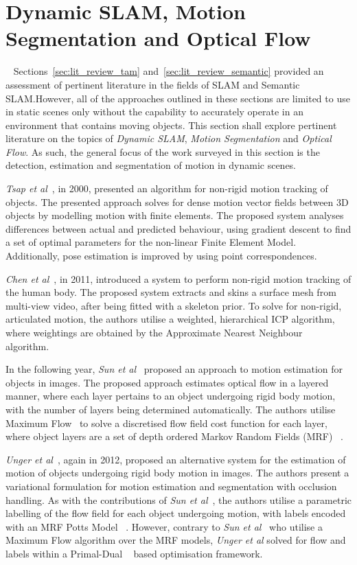 \section{Dynamic SLAM, Motion Segmentation and Optical Flow}
~\label{sec:lit_review_dynamic}
Sections~\ref{sec:lit_review_tam} and~\ref{sec:lit_review_semantic} provided an assessment 
of pertinent literature in the fields of SLAM and Semantic SLAM.\@ However, all of the 
approaches outlined in these sections are limited to use in static scenes only without 
the capability to accurately operate in an environment that contains moving objects. This 
section shall explore pertinent literature on the topics of \textit{Dynamic SLAM}, 
\textit{Motion Segmentation} and \textit{Optical Flow}. As such, the general focus of the 
work surveyed in this section is the detection, estimation and segmentation of motion in 
dynamic scenes.

\textit{Tsap et al}~\cite{Tsap2000}, in 2000, presented an algorithm for non-rigid motion 
tracking of objects. The presented approach solves for dense motion vector fields between 
3D objects by modelling motion with finite elements. The proposed system analyses differences 
between actual and predicted behaviour, using gradient descent to find a set of optimal parameters 
for the non-linear Finite Element Model. Additionally, pose estimation is improved by using point 
correspondences.

\textit{Chen et al}~\cite{Chen2011}, in 2011, introduced a system to perform non-rigid motion 
tracking of the human body. The proposed system extracts and skins a surface mesh from 
multi-view video, after being fitted with a skeleton prior. To solve for non-rigid, articulated 
motion, the authors utilise a weighted, hierarchical ICP algorithm, where weightings are obtained 
by the Approximate Nearest Neighbour~\cite{Indyk2000} algorithm.

In the following year, \textit{Sun et al}~\cite{Sun2012} proposed an approach to motion estimation 
for objects in images. The proposed approach estimates optical flow in a layered manner, where each 
layer pertains to an object undergoing rigid body motion, with the number of layers being determined 
automatically. The authors utilise Maximum Flow~\cite{Lamich2017} to solve a discretised flow field cost 
function for each layer, where object layers are a set of depth ordered Markov Random Fields (MRF) 
~\cite{BishopPRML, Murphy2012ML}.

\textit{Unger et al}~\cite{Unger2012}, again in 2012, proposed an alternative system for the 
estimation of motion of objects undergoing rigid body motion in images. The authors present a 
variational formulation for motion estimation and segmentation with occlusion handling. As with 
the contributions of \textit{Sun et al}~\cite{Sun2012}, the authors utilise a parametric labelling 
of the flow field for each object undergoing motion, with labels encoded with an MRF Potts Model
~\cite{Levada2008}. However, contrary to \textit{Sun et al}~\cite{Sun2012} who utilise a Maximum Flow 
algorithm over the MRF models, \textit{Unger et al} solved for flow and labels within a Primal-Dual
~\cite{Boyd2004Convex} based optimisation framework.

